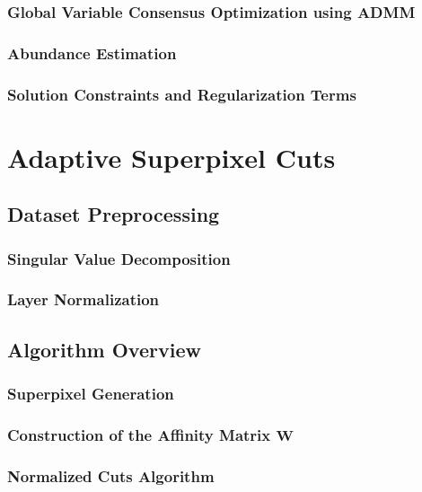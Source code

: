 \documentclass[12pt]{article}
\begin{document}
\subsubsection{Global Variable Consensus Optimization using ADMM}\label{Block ADMM}
\subsubsection{Abundance Estimation}\label{Unmixing Intro}
\subsubsection{Solution Constraints and Regularization Terms}\label{Unmixing Addons}

\clearpage
% 
% 
% 
% 
% 
\section{Adaptive Superpixel Cuts} \label{Algorithm Intro}

\subsection{Dataset Preprocessing} \label{Algorithm Preprocessing}
\subsubsection{Singular Value Decomposition} \label{SVD}
\subsubsection{Layer Normalization} \label{Normalization}

\clearpage
\subsection{Algorithm Overview} \label{Algorithm Overview}
\subsubsection{Superpixel Generation} \label{Algorithm Superpixels}
\subsubsection{Construction of the Affinity Matrix $\mathbf{W}$}\label{Algorithm Laplacian}
\subsubsection{Normalized Cuts Algorithm}\label{Algorithm Ncuts}
\end{document}
